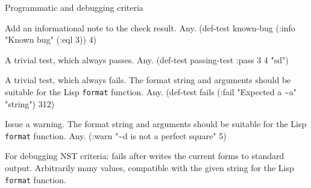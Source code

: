 \begin{criteriaGroup}{Programmatic and debugging criteria}{}

{Add an informational note to the check result.}
{Any.}
{\noExpl}
{\singleEx}{(def-test known-bug (:info "Known bug" (:eql 3)) 4)}

{A trivial test, which always passes.}
{Any.}
{\noExpl}
{\singleEx}{(def-test passing-test :pass 3 4 "sd")}

{A trivial test, which always fails.  The format string and arguments
should be suitable for the Lisp \texttt{format} function.}
{Any.}
{\noExpl}
{\singleEx}{(def-test fails (:fail "Expected a \~{}a" "string") 312)}

{Issue a warning.  The format string and arguments should be suitable for
 the Lisp \texttt{format} function.}
{Any.}
{\noExpl}
{\singleEx}{(:warn "\~{}d is not a perfect square" 5)}

{For debugging NST criteria: fails after writes the current forms to
standard output.}
{Arbitrarily many values, compatible with the given string for the
Lisp \texttt{format} function.}
{\noExpl}{\noEx}{}

\end{criteriaGroup}

